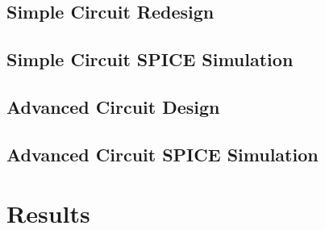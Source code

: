 \documentclass[titlepage, letterpaper, 10.5pt]{article}
\begin{document}
\subsection{Simple Circuit Redesign}

\subsection{Simple Circuit SPICE Simulation}

\subsection{Advanced Circuit Design}

\subsection{Advanced Circuit SPICE Simulation}

\section{Results}
\end{document}
